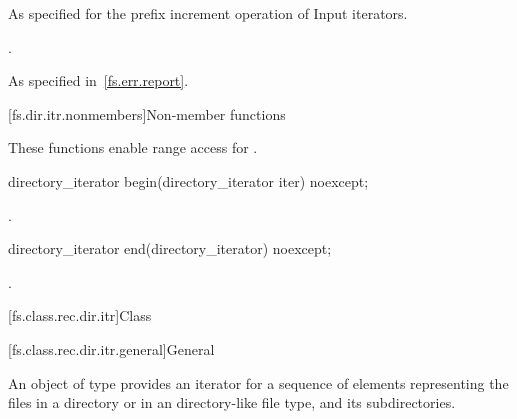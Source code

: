 \begin{itemdescr}
\pnum
\effects
As specified for the prefix increment operation of
Input iterators.

\pnum
\returns
{}.

\pnum
\throws
As specified in~\ref{fs.err.report}.
\end{itemdescr}

[fs.dir.itr.nonmembers]{Non-member functions}

\pnum
These functions enable range access for .

%
\begin{itemdecl}
directory_iterator begin(directory_iterator iter) noexcept;
\end{itemdecl}

\begin{itemdescr}
\pnum
\returns
{}.
\end{itemdescr}

%
\begin{itemdecl}
directory_iterator end(directory_iterator) noexcept;
\end{itemdecl}

\begin{itemdescr}
\pnum
\returns
{}.
\end{itemdescr}

[fs.class.rec.dir.itr]{Class }

[fs.class.rec.dir.itr.general]{General}

%
\pnum
An object of type  provides an iterator for
a sequence of  elements representing the files in a
directory or in an  directory-like file
type, and its subdirectories.

